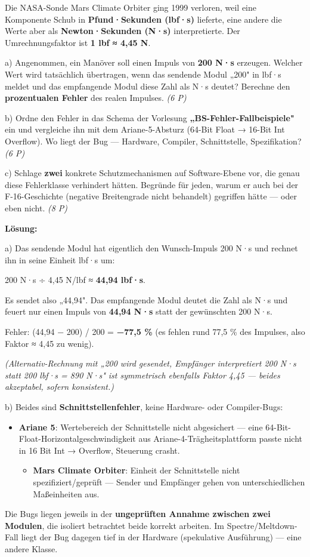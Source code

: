 \documentclass[11pt, a4paper]{article}
\begin{document}
Die NASA-Sonde Mars Climate Orbiter ging 1999 verloren, weil eine Komponente Schub in \textbf{Pfund·Sekunden (lbf·s)} lieferte, eine andere die Werte aber als \textbf{Newton·Sekunden (N·s)} interpretierte. Der Umrechnungsfaktor ist \textbf{1 lbf ≈ 4,45 N}.


a) Angenommen, ein Manöver soll einen Impuls von \textbf{200 N·s} erzeugen. Welcher Wert wird tatsächlich übertragen, wenn das sendende Modul „200" in lbf·s meldet und das empfangende Modul diese Zahl als N·s deutet? Berechne den \textbf{prozentualen Fehler} des realen Impulses. \textit{(6 P)}


b) Ordne den Fehler in das Schema der Vorlesung \textbf{„BS-Fehler-Fallbeispiele"} ein und vergleiche ihn mit dem Ariane-5-Absturz (64-Bit Float → 16-Bit Int Overflow). Wo liegt der Bug — Hardware, Compiler, Schnittstelle, Spezifikation? \textit{(6 P)}


c) Schlage \textbf{zwei} konkrete Schutzmechanismen auf Software-Ebene vor, die genau diese Fehlerklasse verhindert hätten. Begründe für jeden, warum er auch bei der F-16-Geschichte (negative Breitengrade nicht behandelt) gegriffen hätte — oder eben nicht. \textit{(8 P)}


\textbf{Lösung:}


a) Das sendende Modul hat eigentlich den Wunsch-Impuls 200 N·s und rechnet ihn in seine Einheit lbf·s um:

200 N·s ÷ 4,45 N/lbf ≈ \textbf{44,94 lbf·s}.

Es sendet also „44,94". Das empfangende Modul deutet die Zahl als N·s und feuert nur einen Impuls von \textbf{44,94 N·s} statt der gewünschten 200 N·s.

Fehler: (44,94 − 200) / 200 = \textbf{−77,5 \%} (es fehlen rund 77,5 \% des Impulses, also Faktor ≈ 4,45 zu wenig).

\textit{(Alternativ-Rechnung mit „200 wird gesendet, Empfänger interpretiert 200 N·s statt 200 lbf·s = 890 N·s" ist symmetrisch ebenfalls Faktor 4,45 — beides akzeptabel, sofern konsistent.)}


b) Beides sind \textbf{Schnittstellenfehler}, keine Hardware- oder Compiler-Bugs:

\begin{itemize}
  \item \textbf{Ariane 5}: Wertebereich der Schnittstelle nicht abgesichert — eine 64-Bit-Float-Horizontalgeschwindigkeit aus Ariane-4-Trägheitsplattform passte nicht in 16 Bit Int → Overflow, Steuerung crasht.
\begin{itemize}
  \item \textbf{Mars Climate Orbiter}: Einheit der Schnittstelle nicht spezifiziert/geprüft — Sender und Empfänger gehen von unterschiedlichen Maßeinheiten aus.
\end{itemize}
\end{itemize}
Die Bugs liegen jeweils in der \textbf{ungeprüften Annahme zwischen zwei Modulen}, die isoliert betrachtet beide korrekt arbeiten. Im Spectre/Meltdown-Fall liegt der Bug dagegen tief in der Hardware (spekulative Ausführung) — eine andere Klasse.
\end{document}
